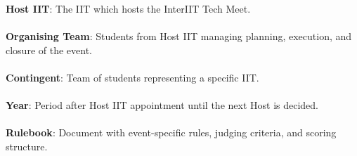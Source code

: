 \textbf{Host IIT}: The IIT which hosts the InterIIT Tech Meet.
\\\\
\textbf{Organising Team}: Students from Host IIT managing planning, execution, and closure of the event.
\\\\
\textbf{Contingent}: Team of students representing a specific IIT.
\\\\
\textbf{Year}: Period after Host IIT appointment until the next Host is decided.
\\\\
\textbf{Rulebook}: Document with event-specific rules, judging criteria, and scoring structure.
